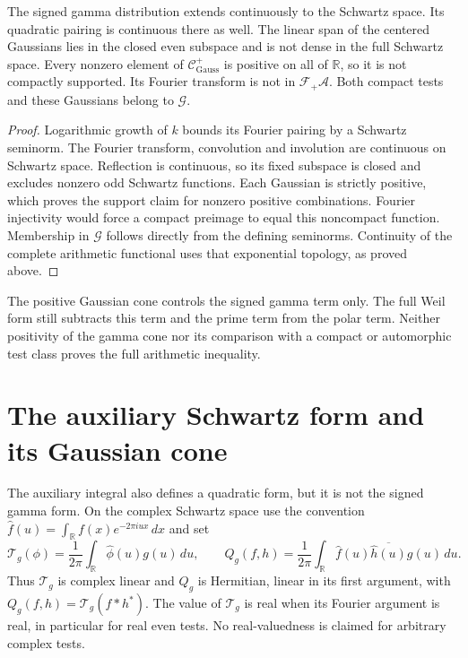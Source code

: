\begin{proposition}
\label{v4-arith:w7-d:lem:W-arch-continuous}
\label{v4-arith:w7-d:cor:gauss-dense}
\label{v4-arith:w7-d:prop:compare-HFD}
The signed gamma distribution extends continuously to the Schwartz
space. Its quadratic pairing is continuous there as well.
The linear span of the centered Gaussians lies in the closed even
subspace and is not dense in the full Schwartz space.
Every nonzero element of \(\mathcal C^+_{\mathrm{Gauss}}\) is positive
on all of \(\mathbb R\), so it is not compactly supported.
Its Fourier transform is not in \(\mathcal F_+\mathscr A\).
Both compact tests and these Gaussians belong to \(\mathscr G\).
\end{proposition}
\begin{proof}
Logarithmic growth of \(k\) bounds its Fourier pairing by a Schwartz
seminorm. The Fourier transform, convolution and involution are
continuous on Schwartz space. Reflection is continuous, so its
fixed subspace is closed and excludes nonzero odd Schwartz functions.
Each Gaussian is strictly positive, which proves the support claim
for nonzero positive combinations. Fourier injectivity would force
a compact preimage to equal this noncompact function.
Membership in \(\mathscr G\) follows directly from the defining
seminorms. Continuity of the complete arithmetic functional uses
that exponential topology, as proved above.
\end{proof}

The positive Gaussian cone controls the signed gamma term only.
The full Weil form still subtracts this term and the prime term
from the polar term. Neither positivity of the gamma cone nor its
comparison with a compact or automorphic test class proves the
full arithmetic inequality.

\section{The auxiliary Schwartz form and its Gaussian cone}
\label{v4-arith:pres74:aux-form}

The auxiliary integral also defines a quadratic form, but it is not
the signed gamma form. On the complex Schwartz space use the convention
$\widehat f(u)=\int_{\mathbb R}f(x)e^{-2\pi iux}\,dx$ and set
\[
 \mathcal T_g(\phi)=\frac1{2\pi}\int_{\mathbb R}\widehat\phi(u)g(u)\,du,
 \qquad
 Q_g(f,h)=\frac1{2\pi}\int_{\mathbb R}
              \widehat f(u)\overline{\widehat h(u)}g(u)\,du.
\]
Thus $\mathcal T_g$ is complex linear and $Q_g$ is Hermitian,
linear in its first argument, with $Q_g(f,h)=\mathcal T_g(f*h^*)$.
The value of $\mathcal T_g$ is real when its Fourier argument is real,
in particular for real even tests. No real-valuedness is claimed
for arbitrary complex tests.

